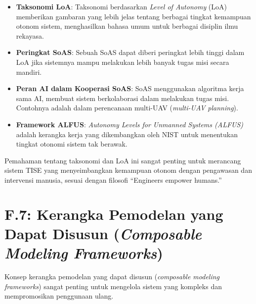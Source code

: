 \documentclass[
  letterpaper,
  DIV=11,
  numbers=noendperiod]{scrreprt}
\providecommand{\tightlist}{%
  \setlength{\itemsep}{0pt}\setlength{\parskip}{0pt}}
\begin{document}
\begin{itemize}
\tightlist
\item
  \textbf{Taksonomi LoA}: Taksonomi berdasarkan \emph{Level of Autonomy}
  (LoA) memberikan gambaran yang lebih jelas tentang berbagai tingkat
  kemampuan otonom sistem, menghasilkan bahasa umum untuk berbagai
  disiplin ilmu rekayasa.
\item
  \textbf{Peringkat SoAS}: Sebuah SoAS dapat diberi peringkat lebih
  tinggi dalam LoA jika sistemnya mampu melakukan lebih banyak tugas
  misi secara mandiri.
\item
  \textbf{Peran AI dalam Kooperasi SoAS}: SoAS menggunakan algoritma
  kerja sama AI, membuat sistem berkolaborasi dalam melakukan tugas
  misi. Contohnya adalah dalam perencanaan multi-UAV (\emph{multi-UAV
  planning}).
\item
  \textbf{Framework ALFUS}: \emph{Autonomy Levels for Unmanned Systems
  (ALFUS)} adalah kerangka kerja yang dikembangkan oleh NIST untuk
  menentukan tingkat otonomi sistem tak berawak.
\end{itemize}

Pemahaman tentang taksonomi dan LoA ini sangat penting untuk merancang
sistem TISE yang menyeimbangkan kemampuan otonom dengan pengawasan dan
intervensi manusia, sesuai dengan filosofi ``Engineers empower humans.''

\section{\texorpdfstring{\textbf{F.7: Kerangka Pemodelan yang Dapat
Disusun (\emph{Composable Modeling
Frameworks})}}{F.7: Kerangka Pemodelan yang Dapat Disusun (Composable Modeling Frameworks)}}\label{f.7-kerangka-pemodelan-yang-dapat-disusun-composable-modeling-frameworks}

Konsep kerangka pemodelan yang dapat disusun (\emph{composable modeling
frameworks}) sangat penting untuk mengelola sistem yang kompleks dan
mempromosikan penggunaan ulang.
\end{document}

